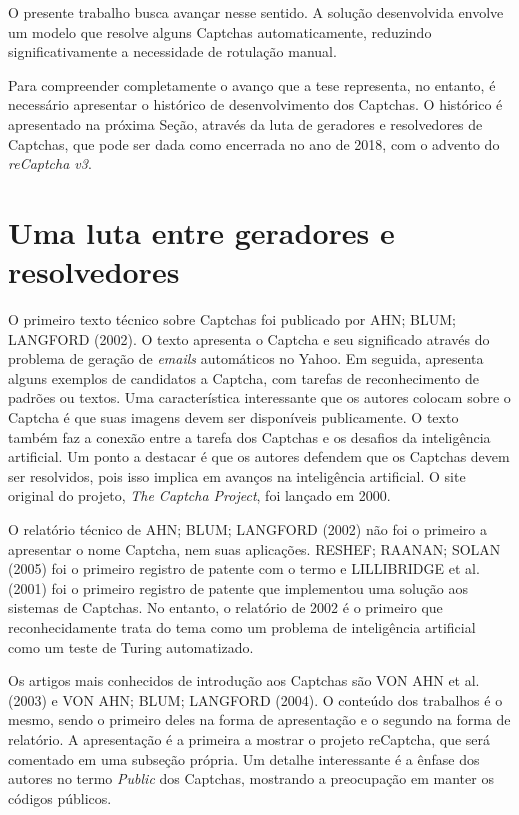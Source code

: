\documentclass[12pt,twoside,brazilian]{book}
\begin{document}
O presente trabalho busca avançar nesse sentido. A solução desenvolvida
envolve um modelo que resolve alguns Captchas automaticamente, reduzindo
significativamente a necessidade de rotulação manual.

Para compreender completamente o avanço que a tese representa, no
entanto, é necessário apresentar o histórico de desenvolvimento dos
Captchas. O histórico é apresentado na próxima Seção, através da luta de
geradores e resolvedores de Captchas, que pode ser dada como encerrada
no ano de 2018, com o advento do \emph{reCaptcha v3}.

\hypertarget{uma-luta-entre-geradores-e-resolvedores}{%
\section{Uma luta entre geradores e
resolvedores}\label{uma-luta-entre-geradores-e-resolvedores}}

O primeiro texto técnico sobre Captchas foi publicado por AHN; BLUM;
LANGFORD (2002). O texto apresenta o Captcha e seu significado através
do problema de geração de \emph{emails} automáticos no Yahoo. Em
seguida, apresenta alguns exemplos de candidatos a Captcha, com tarefas
de reconhecimento de padrões ou textos. Uma característica interessante
que os autores colocam sobre o Captcha é que suas imagens devem ser
disponíveis publicamente. O texto também faz a conexão entre a tarefa
dos Captchas e os desafios da inteligência artificial. Um ponto a
destacar é que os autores defendem que os Captchas devem ser resolvidos,
pois isso implica em avanços na inteligência artificial. O site original
do projeto, \emph{The Captcha Project}, foi lançado em 2000.

O relatório técnico de AHN; BLUM; LANGFORD (2002) não foi o primeiro a
apresentar o nome Captcha, nem suas aplicações. RESHEF; RAANAN; SOLAN
(2005) foi o primeiro registro de patente com o termo e LILLIBRIDGE et
al. (2001) foi o primeiro registro de patente que implementou uma
solução aos sistemas de Captchas. No entanto, o relatório de 2002 é o
primeiro que reconhecidamente trata do tema como um problema de
inteligência artificial como um teste de Turing automatizado.

Os artigos mais conhecidos de introdução aos Captchas são VON AHN et al.
(2003) e VON AHN; BLUM; LANGFORD (2004). O conteúdo dos trabalhos é o
mesmo, sendo o primeiro deles na forma de apresentação e o segundo na
forma de relatório. A apresentação é a primeira a mostrar o projeto
reCaptcha, que será comentado em uma subseção própria. Um detalhe
interessante é a ênfase dos autores no termo \emph{Public} dos Captchas,
mostrando a preocupação em manter os códigos públicos.
\end{document}
